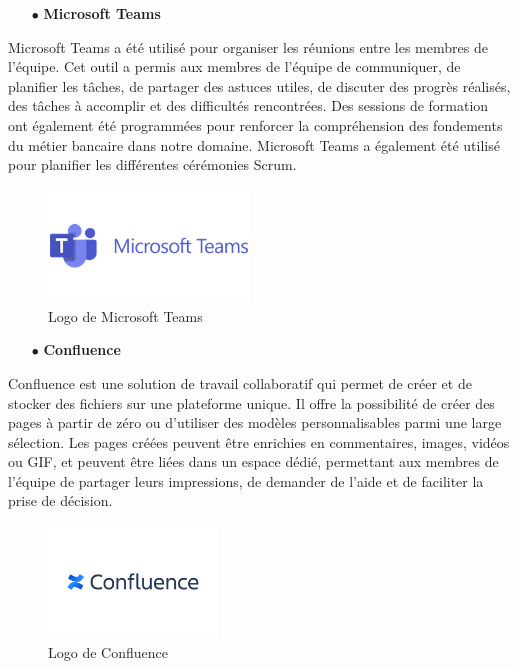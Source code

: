 \begin{itemize}
    \item[$\bullet$] \textbf{Microsoft Teams}
    \end{itemize}
    Microsoft Teams a été utilisé pour organiser les réunions entre les membres de l'équipe. Cet outil a permis aux membres de l'équipe de communiquer, de planifier les tâches, de partager des astuces utiles, de discuter des progrès réalisés, des tâches à accomplir et des difficultés rencontrées. Des sessions de formation ont également été programmées pour renforcer la compréhension des fondements du métier bancaire dans notre domaine. Microsoft Teams a également été utilisé pour planifier les différentes cérémonies Scrum.
    \begin{figure}[!h]
        \centering %
            \includegraphics[height=3cm]{images/logos/microsoftTeams.png}
        \caption{Logo de Microsoft Teams}
    \end{figure}

    \begin{itemize}
        \item[$\bullet$] \textbf{Confluence}
        \end{itemize}
        Confluence est une solution de travail collaboratif qui permet de créer et de stocker des fichiers sur une plateforme unique. Il offre la possibilité de créer des pages à partir de zéro ou d'utiliser des modèles personnalisables parmi une large sélection. Les pages créées peuvent être enrichies en commentaires, images, vidéos ou GIF, et peuvent être liées dans un espace dédié, permettant aux membres de l'équipe de partager leurs impressions, de demander de l'aide et de faciliter la prise de décision.
        \begin{figure}[!h]
            \centering %
                \includegraphics[height=3cm]{images/logos/Confluence.png}
            \caption{Logo de Confluence}
        \end{figure}

